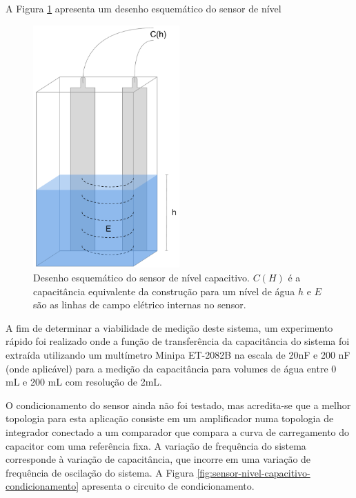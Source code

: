 \documentclass[a4paper]{instrumentacao}
\begin{document}
A Figura \ref{fig:sensor-nivel-capacitivo} apresenta um desenho esquemático do sensor de nível

\begin{figure}[H]
	\centering \includegraphics[width=0.5\textwidth]{SensorNivelCapacitivo.pdf}
	\caption{Desenho esquemático do sensor de nível capacitivo. $C(H)$ é a capacitância equivalente da construção para um nível de água $h$ e $E$ são as linhas de campo elétrico internas no sensor.}
	\label{fig:sensor-nivel-capacitivo}
\end{figure}

A fim de determinar a viabilidade de medição deste sistema, um experimento rápido foi realizado onde a função de transferência da capacitância do sistema foi extraída utilizando um multímetro Minipa ET-2082B \cite{multimetro-minipa} na escala de 20nF e 200 nF (onde aplicável) para a medição da capacitância para volumes de água entre 0 mL e 200 mL com resolução de 2mL.

O condicionamento do sensor ainda não foi testado, mas acredita-se que a melhor topologia para esta aplicação consiste em um amplificador numa topologia de integrador conectado a um comparador que compara a curva de carregamento do capacitor com uma referência fixa. A variação de frequência do sistema corresponde à variação de capacitância, que incorre em uma variação de frequência de oscilação do sistema. A Figura \ref{fig:sensor-nivel-capacitivo-condicionamento} apresenta o circuito de condicionamento.
\end{document}
